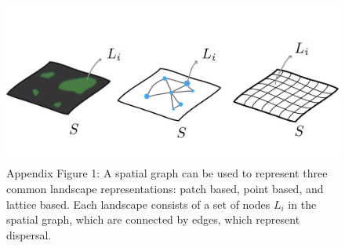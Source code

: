 \documentclass[]{article}
\begin{document}
\begin{figure}[h]
    \centering
    \includegraphics[width=17cm]{figs/different_spatial_models_w_labels.png}
    \caption{Appendix Figure 1: A spatial graph can be used to represent three common landscape representations: patch based, point based, and lattice based. Each landscape consists of a set of nodes $L_i$ in the spatial graph, which are connected by edges, which represent dispersal.  }
    \label{fig:spatial_models}
\end{figure}
\end{document}
